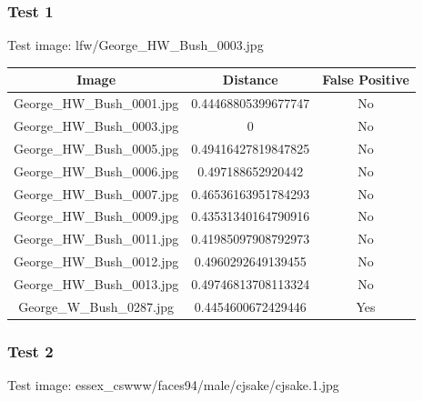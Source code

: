 \documentclass[12pt]{article}
\begin{document}
\newpage
\subsubsection{Test 1}
Test image: lfw/George\_HW\_Bush\_0003.jpg

\begin{center}
\begin{tabular}{ccc}
Image & Distance & False Positive \\
\hline
George\_HW\_Bush\_0001.jpg & 0.44468805399677747 & No \\
George\_HW\_Bush\_0003.jpg & 0 & No \\
George\_HW\_Bush\_0005.jpg & 0.49416427819847825 & No \\
George\_HW\_Bush\_0006.jpg & 0.497188652920442 & No \\
George\_HW\_Bush\_0007.jpg & 0.46536163951784293 & No \\
George\_HW\_Bush\_0009.jpg & 0.43531340164790916 & No \\
George\_HW\_Bush\_0011.jpg & 0.41985097908792973 & No \\
George\_HW\_Bush\_0012.jpg & 0.4960292649139455 & No \\
George\_HW\_Bush\_0013.jpg & 0.49746813708113324 & No \\
George\_W\_Bush\_0287.jpg & 0.4454600672429446 & Yes \\
\end{tabular}
\end{center}

\subsubsection{Test 2}
Test image: essex\_cswww/faces94/male/cjsake/cjsake.1.jpg
\end{document}
